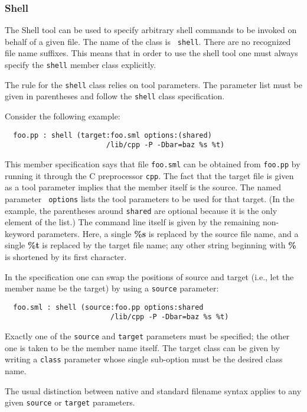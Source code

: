 \documentclass[titlepage,letterpaper]{article}
\begin{document}
\subsubsection{Shell}

The Shell tool can be used to specify arbitrary shell commands to be
invoked on behalf of a given file.  The name of the class is {\tt
shell}.  There are no recognized file name suffixes.  This means that
in order to use the shell tool one must always specify the {\tt shell}
member class explicitly.

The rule for the {\tt shell} class relies on tool parameters.  The
parameter list must be given in parentheses and follow the {\tt shell}
class specification.

Consider the following example:

\begin{verbatim}
  foo.pp : shell (target:foo.sml options:(shared)
                        /lib/cpp -P -Dbar=baz %s %t)
\end{verbatim}

This member specification says that file {\tt foo.sml} can be obtained
from {\tt foo.pp} by running it through the C preprocessor {\tt cpp}.
The fact that the target file is given as a tool parameter implies
that the member itself is the source.  The named parameter {\tt
options} lists the tool parameters to be used for that target. (In the
example, the parentheses around {\tt shared} are optional because it
is the only element of the list.) The command line itself is given by
the remaining non-keyword parameters.  Here, a single {\bf \%s} is
replaced by the source file name, and a single {\bf \%t} is replaced
by the target file name; any other string beginning with {\bf \%} is
shortened by its first character.

In the specification one can swap the positions of source and target
(i.e., let the member name be the target) by using a {\tt source}
parameter:

\begin{verbatim}
  foo.sml : shell (source:foo.pp options:shared
                         /lib/cpp -P -Dbar=baz %s %t)
\end{verbatim}

Exactly one of the {\tt source} and {\tt target} parameters must be
specified; the other one is taken to be the member name itself.  The
target class can be given by writing a {\tt class} parameter whose
single sub-option must be the desired class name.

The usual distinction between native and standard filename syntax
applies to any given {\tt source} or {\tt target} parameters.
\end{document}

